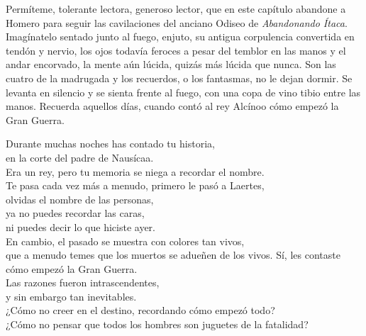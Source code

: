 \label{cap:guerra}

Permíteme, tolerante lectora, generoso lector, que en este capítulo abandone a Homero para seguir las cavilaciones del anciano Odiseo de \emph{Abandonando Ítaca}. Imagínatelo sentado junto al fuego, enjuto, su antigua corpulencia convertida en tendón y nervio, los ojos todavía feroces a pesar del temblor en las manos y el andar encorvado, la mente aún lúcida, quizás más lúcida que nunca. Son las cuatro de la madrugada y los recuerdos, o los fantasmas, no le dejan dormir. Se levanta en silencio y se sienta frente al fuego, con una copa de vino tibio entre las manos. Recuerda aquellos días, cuando contó al rey Alcínoo cómo empezó la Gran Guerra.

%
\begin{versopropio}
Durante muchas noches has contado tu historia,\\
en la corte del padre de Nausícaa.\\
Era un rey, pero tu memoria se niega a recordar el nombre.\\
Te pasa cada vez más a menudo, primero le pasó a Laertes,\\
olvidas el nombre de las personas,\\
ya no puedes recordar las caras,\\
ni puedes decir lo que hiciste ayer.\\
En cambio, el pasado se muestra con colores tan vivos,\\
que a menudo temes que los muertos se adueñen de los vivos.
\stanzabreak
Sí, les contaste cómo empezó la Gran Guerra.\\
Las razones fueron intrascendentes,\\
y sin embargo tan inevitables.\\
¿Cómo no creer en el destino, recordando cómo empezó todo?\\
¿Cómo no pensar que todos los hombres son juguetes de la fatalidad?
\end{versopropio}
%

